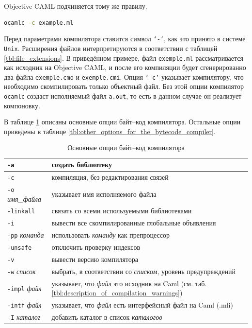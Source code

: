 Objective CAML подчиняется тому же правилу.

\begin{lstlisting}[language=Bash]
ocamlc -c example.ml
\end{lstlisting}

Перед параметрами компилятора ставится символ \texttt{`-'}, как это принято в
системе \texttt{Unix}. Расширения файлов интерпретируются в соответствии с
таблицей \ref{tbl:file_extensions}. В приведённом примере, файл
\texttt{exemple.ml} рассматривается как исходник на Objective CAML, и после его
компиляции будет сгенерированно два файла \texttt{exemple.cmo} и
\texttt{exemple.cmi}. Опция \texttt{`-c'} указывает компилятору, что необходимо
скомпилировать только объектный файл. Без этой опции компилятор \texttt{ocamlc}
создаст исполняемый файл \texttt{a.out}, то есть в данном случае он реализует
компоновку.

В таблице \ref{tbl:principal_options_of_the_bytecode_compiler} описаны основные
опции байт--код компилятора. Остальные опции приведены в таблице
\ref{tbl:other_options_for_the_bytecode_compiler}.

\begin{table}[hc]
	\centering
	\caption{\label{tbl:principal_options_of_the_bytecode_compiler}Основные
опции байт--код компилятора}
	\begin{tabular}{|l|l|}
	\hline
	\texttt{-a} & создать библиотеку \\
	\hline
	\texttt{-c} & компиляция, без редактирования связей \\
	\hline
	\texttt{-o} {\it имя\_файла} & указывает имя исполняемого файла \\
	\hline
	\texttt{-linkall} & связать со всеми используемыми библиотеками \\
	\hline
	\texttt{-i} & вывести все скомпилированные глобальные объявления \\
	\hline
	\texttt{-pp} {\it команда} & использовать {\it команду} как препроцессор \\
	\hline
	\texttt{-unsafe} & отключить проверку индексов \\
	\hline
	\texttt{-v} & вывести версию компилятора \\
	\hline
	\texttt{-w} {\it список} & выбрать, в соответствии со {\it списком}, уровень
предупреждений \\
	\hline
	\texttt{-impl} {\it файл} & указывает, что {\it файл} это исходник на Caml
(см. таб. \ref{tbl:description_of_compilation_warnings}) \\
	\hline
	\texttt{-intf} {\it файл} & указывает, что {\it файл} есть интерфейсный файл
на Caml (.mli) \\
	\hline
	\texttt{-I} {\it каталог} & добавить каталог в список {\it каталогов} \\
	\hline
	\end{tabular}
\end{table}

